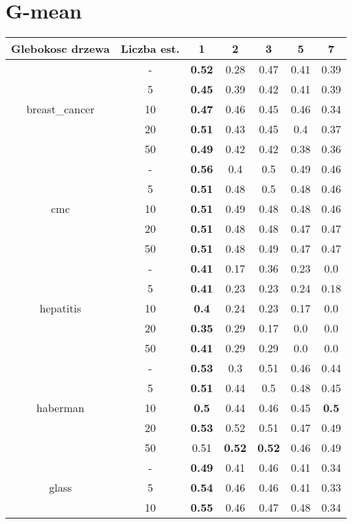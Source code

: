 \documentclass{article}%
\begin{document}
\section*{G{-}mean}%
\begin{longtable}{c|c|ccccc}%
\hline%
Glebokosc drzewa&Liczba est.&1&2&3&5&7\\%
\hline%
\multirow{5}{*}{breast\_cancer}&{-}&\textbf{0.52}&0.28&0.47&0.41&0.39\\%
\cline{2%
-%
7}%
&5&\textbf{0.45}&0.39&0.42&0.41&0.39\\%
\cline{2%
-%
7}%
&10&\textbf{0.47}&0.46&0.45&0.46&0.34\\%
\cline{2%
-%
7}%
&20&\textbf{0.51}&0.43&0.45&0.4&0.37\\%
\cline{2%
-%
7}%
&50&\textbf{0.49}&0.42&0.42&0.38&0.36\\%
\hline%
\multirow{5}{*}{cmc}&{-}&\textbf{0.56}&0.4&0.5&0.49&0.46\\%
\cline{2%
-%
7}%
&5&\textbf{0.51}&0.48&0.5&0.48&0.46\\%
\cline{2%
-%
7}%
&10&\textbf{0.51}&0.49&0.48&0.48&0.46\\%
\cline{2%
-%
7}%
&20&\textbf{0.51}&0.48&0.48&0.47&0.47\\%
\cline{2%
-%
7}%
&50&\textbf{0.51}&0.48&0.49&0.47&0.47\\%
\hline%
\multirow{5}{*}{hepatitis}&{-}&\textbf{0.41}&0.17&0.36&0.23&0.0\\%
\cline{2%
-%
7}%
&5&\textbf{0.41}&0.23&0.23&0.24&0.18\\%
\cline{2%
-%
7}%
&10&\textbf{0.4}&0.24&0.23&0.17&0.0\\%
\cline{2%
-%
7}%
&20&\textbf{0.35}&0.29&0.17&0.0&0.0\\%
\cline{2%
-%
7}%
&50&\textbf{0.41}&0.29&0.29&0.0&0.0\\%
\hline%
\multirow{5}{*}{haberman}&{-}&\textbf{0.53}&0.3&0.51&0.46&0.44\\%
\cline{2%
-%
7}%
&5&\textbf{0.51}&0.44&0.5&0.48&0.45\\%
\cline{2%
-%
7}%
&10&\textbf{0.5}&0.44&0.46&0.45&\textbf{0.5}\\%
\cline{2%
-%
7}%
&20&\textbf{0.53}&0.52&0.51&0.47&0.49\\%
\cline{2%
-%
7}%
&50&0.51&\textbf{0.52}&\textbf{0.52}&0.46&0.49\\%
\hline%
\multirow{5}{*}{glass}&{-}&\textbf{0.49}&0.41&0.46&0.41&0.34\\%
\cline{2%
-%
7}%
&5&\textbf{0.54}&0.46&0.46&0.41&0.33\\%
\cline{2%
-%
7}%
&10&\textbf{0.55}&0.46&0.47&0.48&0.34\\%

\end{longtable}
\end{document}
